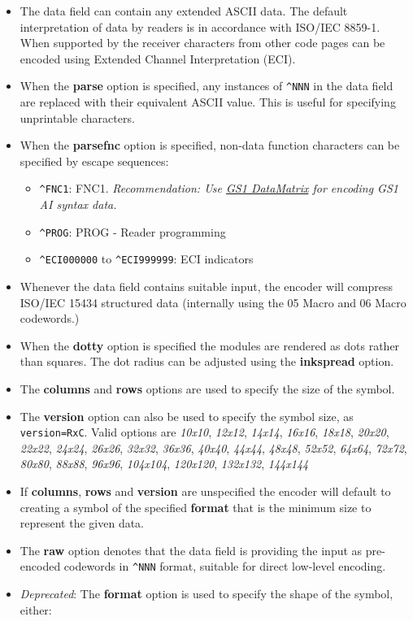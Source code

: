 \begin{itemize}
\tightlist
\item
  The data field can contain any extended ASCII data. The default
  interpretation of data by readers is in accordance with ISO/IEC
  8859-1. When supported by the receiver characters from other code
  pages can be encoded using Extended Channel Interpretation (ECI).
\item
  When the \textbf{parse} option is specified, any instances of
  \texttt{\^{}NNN} in the data field are replaced with their equivalent
  ASCII value. This is useful for specifying unprintable characters.
\item
  When the \textbf{parsefnc} option is specified, non-data function
  characters can be specified by escape sequences:

  \begin{itemize}
  \tightlist
  \item
    \texttt{\^{}FNC1}: FNC1. \emph{Recommendation: Use
    \protect\hyperlink{gs1-datamatrix}{GS1 DataMatrix} for encoding GS1
    AI syntax data.}
  \item
    \texttt{\^{}PROG}: PROG - Reader programming
  \item
    \texttt{\^{}ECI000000} to \texttt{\^{}ECI999999}: ECI indicators
  \end{itemize}
\item
  Whenever the data field contains suitable input, the encoder will
  compress ISO/IEC 15434 structured data (internally using the 05 Macro
  and 06 Macro codewords.)
\item
  When the \textbf{dotty} option is specified the modules are rendered
  as dots rather than squares. The dot radius can be adjusted using the
  \textbf{inkspread} option.
\item
  The \textbf{columns} and \textbf{rows} options are used to specify the
  size of the symbol.
\item
  The \textbf{version} option can also be used to specify the symbol
  size, as \texttt{version=RxC}. Valid options are \emph{10x10},
  \emph{12x12}, \emph{14x14}, \emph{16x16}, \emph{18x18}, \emph{20x20},
  \emph{22x22}, \emph{24x24}, \emph{26x26}, \emph{32x32}, \emph{36x36},
  \emph{40x40}, \emph{44x44}, \emph{48x48}, \emph{52x52}, \emph{64x64},
  \emph{72x72}, \emph{80x80}, \emph{88x88}, \emph{96x96},
  \emph{104x104}, \emph{120x120}, \emph{132x132}, \emph{144x144}
\item
  If \textbf{columns}, \textbf{rows} and \textbf{version} are
  unspecified the encoder will default to creating a symbol of the
  specified \textbf{format} that is the minimum size to represent the
  given data.
\item
  The \textbf{raw} option denotes that the data field is providing the
  input as pre-encoded codewords in \texttt{\^{}NNN} format, suitable
  for direct low-level encoding.
\item
  \emph{Deprecated}: The \textbf{format} option is used to specify the
  shape of the symbol, either:


\end{itemize}
